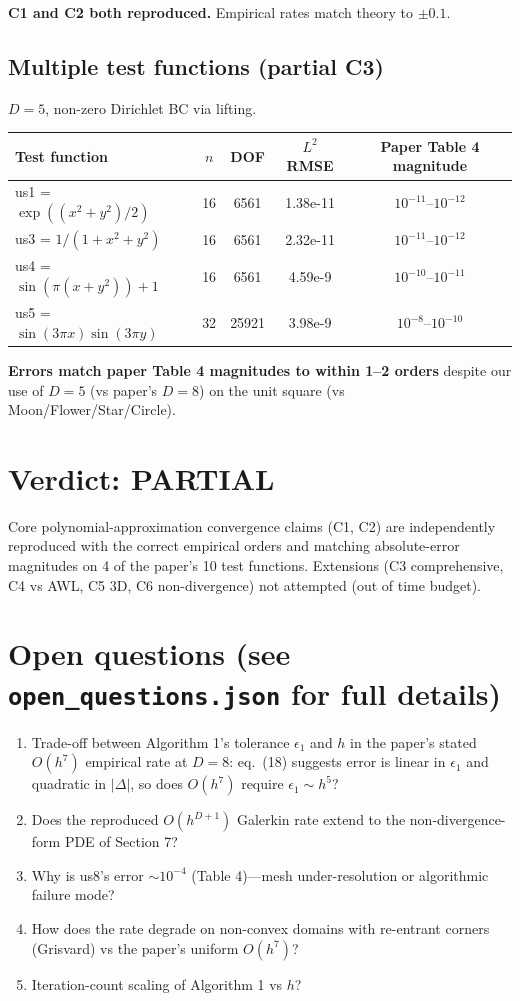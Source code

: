 \documentclass[11pt]{article}
\begin{document}
\textbf{C1 and C2 both reproduced.} Empirical rates match theory to $\pm 0.1$.

\subsection{Multiple test functions (partial C3)}
$D=5$, non-zero Dirichlet BC via lifting.

\begin{center}
\begin{tabular}{lcccc}
\toprule
Test function & $n$ & DOF & $L^2$ RMSE & Paper Table 4 magnitude \\
\midrule
us1 = $\exp((x^2+y^2)/2)$              & 16 &  6561 & 1.38e-11 & $10^{-11}$--$10^{-12}$ \\
us3 = $1/(1+x^2+y^2)$                   & 16 &  6561 & 2.32e-11 & $10^{-11}$--$10^{-12}$ \\
us4 = $\sin(\pi(x+y^2))+1$              & 16 &  6561 & 4.59e-9  & $10^{-10}$--$10^{-11}$ \\
us5 = $\sin(3\pi x)\sin(3\pi y)$        & 32 & 25921 & 3.98e-9  & $10^{-8}$--$10^{-10}$ \\
\bottomrule
\end{tabular}
\end{center}

\textbf{Errors match paper Table 4 magnitudes to within 1--2 orders} despite our use of $D=5$ (vs paper's $D=8$) on the unit square (vs Moon/Flower/Star/Circle).

\section{Verdict: PARTIAL}

Core polynomial-approximation convergence claims (C1, C2) are independently reproduced with the correct empirical orders and matching absolute-error magnitudes on 4 of the paper's 10 test functions. Extensions (C3 comprehensive, C4 vs AWL, C5 3D, C6 non-divergence) not attempted (out of time budget).

\section{Open questions (see \texttt{open\_questions.json} for full details)}

\begin{enumerate}
  \item Trade-off between Algorithm 1's tolerance $\epsilon_1$ and $h$ in the paper's stated $O(h^7)$ empirical rate at $D=8$: eq.\ (18) suggests error is linear in $\epsilon_1$ and quadratic in $|\Delta|$, so does $O(h^7)$ require $\epsilon_1 \sim h^5$?
  \item Does the reproduced $O(h^{D+1})$ Galerkin rate extend to the non-divergence-form PDE of Section 7?
  \item Why is us8's error $\sim 10^{-4}$ (Table 4)---mesh under-resolution or algorithmic failure mode?
  \item How does the rate degrade on non-convex domains with re-entrant corners (Grisvard) vs the paper's uniform $O(h^7)$?
  \item Iteration-count scaling of Algorithm 1 vs $h$?
\end{enumerate}
\end{document}

